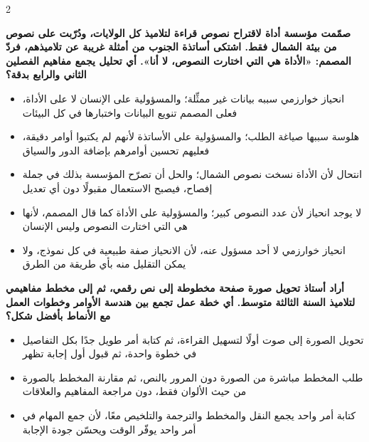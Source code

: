 \documentclass[10pt,a4paper]{article}
\begin{document}
\begin{multicols}{2}
\noindent\begin{minipage}{\linewidth}
\hangindent=0.7cm\textbf{صمّمت مؤسسة أداة لاقتراح نصوص قراءة لتلاميذ كل الولايات، ودُرّبت على نصوص من بيئة الشمال فقط. اشتكى أساتذة الجنوب من أمثلة غريبة عن تلاميذهم، فردّ المصمم: «الأداة هي التي اختارت النصوص، لا أنا». أي تحليل يجمع مفاهيم الفصلين الثاني والرابع بدقة؟}
\begin{itemize}[leftmargin=0.95cm, labelsep=4pt, itemsep=1pt, topsep=3pt, parsep=0pt]
  \item[\textbf{أ)}] انحياز خوارزمي سببه بيانات غير ممثِّلة؛ والمسؤولية على الإنسان لا على الأداة، فعلى المصمم تنويع البيانات واختبارها في كل البيئات
  \item[\textbf{ب)}] هلوسة سببها صياغة الطلب؛ والمسؤولية على الأساتذة لأنهم لم يكتبوا أوامر دقيقة، فعليهم تحسين أوامرهم بإضافة الدور والسياق
  \item[\textbf{ج)}] انتحال لأن الأداة نسخت نصوص الشمال؛ والحل أن تصرّح المؤسسة بذلك في جملة إفصاح، فيصبح الاستعمال مقبولًا دون أي تعديل
  \item[\textbf{د)}] لا يوجد انحياز لأن عدد النصوص كبير؛ والمسؤولية على الأداة كما قال المصمم، لأنها هي التي اختارت النصوص وليس الإنسان
  \item[\textbf{هـ)}] انحياز خوارزمي لا أحد مسؤول عنه، لأن الانحياز صفة طبيعية في كل نموذج، ولا يمكن التقليل منه بأي طريقة من الطرق
\end{itemize}
\end{minipage}\par\vspace{8pt plus 6pt}
\noindent\begin{minipage}{\linewidth}
\hangindent=0.7cm\textbf{أراد أستاذ تحويل صورة صفحة مخطوطة إلى نص رقمي، ثم إلى مخطط مفاهيمي لتلاميذ السنة الثالثة متوسط. أي خطة عمل تجمع بين هندسة الأوامر وخطوات العمل مع الأنماط بأفضل شكل؟}
\begin{itemize}[leftmargin=0.95cm, labelsep=4pt, itemsep=1pt, topsep=3pt, parsep=0pt]
  \item[\textbf{أ)}] تحويل الصورة إلى صوت أولًا لتسهيل القراءة، ثم كتابة أمر طويل جدًا بكل التفاصيل في خطوة واحدة، ثم قبول أول إجابة تظهر
  \item[\textbf{ب)}] طلب المخطط مباشرة من الصورة دون المرور بالنص، ثم مقارنة المخطط بالصورة من حيث الألوان فقط، دون مراجعة المفاهيم والعلاقات
  \item[\textbf{ج)}] كتابة أمر واحد يجمع النقل والمخطط والترجمة والتلخيص معًا، لأن جمع المهام في أمر واحد يوفّر الوقت ويحسّن جودة الإجابة

\end{itemize}
\end{minipage}
\end{multicols}
\end{document}
